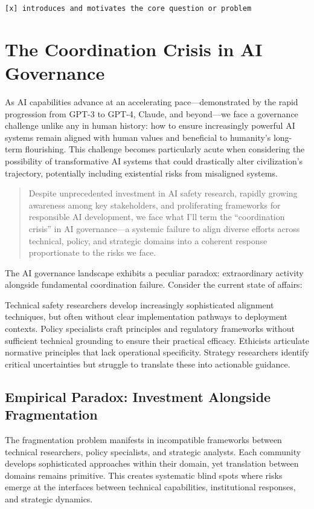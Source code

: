 \documentclass[
  11pt,
  letterpaper,
]{book}
\begin{document}
\texttt{{[}x{]}\ introduces\ and\ motivates\ the\ core\ question\ or\ problem}

\section{The Coordination Crisis in AI
Governance}\label{sec-coordination-crisis}

As AI capabilities advance at an accelerating pace---demonstrated by the
rapid progression from GPT-3 to GPT-4, Claude, and beyond---we face a
governance challenge unlike any in human history: how to ensure
increasingly powerful AI systems remain aligned with human values and
beneficial to humanity's long-term flourishing. This challenge becomes
particularly acute when considering the possibility of transformative AI
systems that could drastically alter civilization's trajectory,
potentially including existential risks from misaligned systems.

\begin{quote}
Despite unprecedented investment in AI safety research, rapidly growing
awareness among key stakeholders, and proliferating frameworks for
responsible AI development, we face what I'll term the ``coordination
crisis'' in AI governance---a systemic failure to align diverse efforts
across technical, policy, and strategic domains into a coherent response
proportionate to the risks we face.
\end{quote}

The AI governance landscape exhibits a peculiar paradox: extraordinary
activity alongside fundamental coordination failure. Consider the
current state of affairs:

Technical safety researchers develop increasingly sophisticated
alignment techniques, but often without clear implementation pathways to
deployment contexts. Policy specialists craft principles and regulatory
frameworks without sufficient technical grounding to ensure their
practical efficacy. Ethicists articulate normative principles that lack
operational specificity. Strategy researchers identify critical
uncertainties but struggle to translate these into actionable guidance.

\subsection{Empirical Paradox: Investment Alongside
Fragmentation}\label{sec-empirical-paradox}

The fragmentation problem manifests in incompatible frameworks between
technical researchers, policy specialists, and strategic analysts. Each
community develops sophisticated approaches within their domain, yet
translation between domains remains primitive. This creates systematic
blind spots where risks emerge at the interfaces between technical
capabilities, institutional responses, and strategic dynamics.
\end{document}
